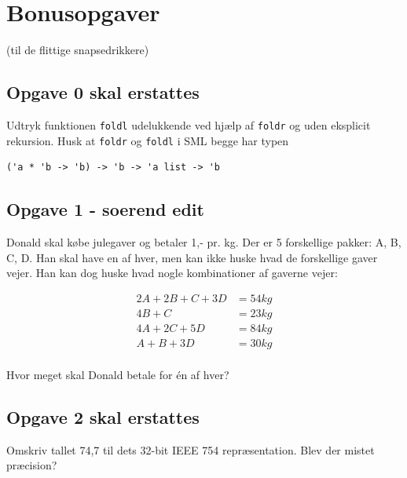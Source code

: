 \section{\huge{Bonusopgaver}}
(til de flittige snapsedrikkere)


\subsection{Opgave 0 skal erstattes}
Udtryk funktionen \texttt{foldl} udelukkende ved hjælp af
\texttt{foldr} og uden eksplicit rekursion.
Husk at \texttt{foldr} og \texttt{foldl} i SML begge har typen
\begin{verbatim}
('a * 'b -> 'b) -> 'b -> 'a list -> 'b
\end{verbatim}


\subsection{Opgave 1 - soerend edit}
Donald skal købe julegaver og betaler 1,- pr. kg. Der er 5 forskellige
pakker: A, B, C, D. Han skal have en af hver, men kan ikke huske hvad de
forskellige gaver vejer. Han kan dog huske hvad nogle kombinationer af gaverne
vejer:

\begin{align*}
2A + 2B + C + 3D &= 54kg \\
4B + C &= 23kg \\
4A + 2C + 5D &= 84kg \\
A + B + 3D &= 30kg \\
\end{align*}

Hvor meget skal Donald betale for én af hver?




\subsection{Opgave 2 skal erstattes}
Omskriv tallet 74,7 til dets 32-bit IEEE 754 repræsentation. Blev
der mistet præcision?

